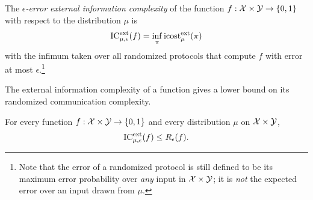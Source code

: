 \begin{definition}
The \emph{$\epsilon$-error external information complexity} of the function $f : \mathcal{X} \times \mathcal{Y} \to \{0,1\}$ with respect to the distribution $\mu$ is
\[
\mathrm{IC}^{\mathrm{ext}}_{\mu,\epsilon}(f) = \inf_{\pi} \mathrm{icost}^{\mathrm{ext}}_\mu(\pi)
\]
with the infimum taken over all randomized protocols that compute $f$ with error at most $\epsilon$.\footnote{Note that the error of a randomized protocol is still defined to be its maximum error probability over \emph{any} input in $\mathcal{X} \times \mathcal{Y}$; it is \emph{not} the expected error over an input drawn from $\mu$.}
\end{definition}

The external information complexity of a function gives a lower bound on its randomized communication complexity.

\begin{theorem}\label{th:2}
For every function $f : \mathcal{X} \times \mathcal{Y} \to \{0,1\}$ and every distribution $\mu$ on $\mathcal{X} \times \mathcal{Y}$,
\[
\mathrm{IC}^{\mathrm{ext}}_{\mu,\epsilon}(f) \le R_\epsilon(f).
\]
\end{theorem}


